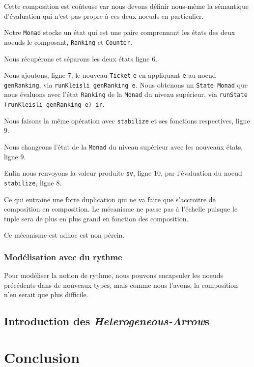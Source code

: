 \documentclass{llncs}
\newcommand{\SAs}{\emph{Heterogeneous-Arrow}s }
\begin{document}
Cette composition est coûteuse car nous devons définir nous-même la sémantique
d'évaluation qui n'est pas propre à ces deux noeuds en particulier.

Notre \lstinline{Monad} stocke un état qui est une paire comprennant les états
des deux noeuds le composant, \lstinline{Ranking} et \lstinline{Counter}.

Nous récupérons et séparons les deux états ligne 6.

Nous ajoutons, ligne 7, le nouveau \lstinline{Ticket} \lstinline{e} en appliquant \lstinline{e}
au noeud \lstinline{genRanking}, via \lstinline{runKleisli genRanking e}.
Nous obtenons un \lstinline{State Monad} que nous évaluons avec l'état \lstinline{Ranking}
de la \lstinline{Monad} du niveau supérieur, via \lstinline{runState (runKleisli genRanking e) ir}.

Nous faisons la même opération avec \lstinline{stabilize} et ses fonctions respectives,
ligne 9.

Nous changeons l'état de la \lstinline{Monad} du niveau supérieur avec les nouveaux
états, ligne 9.

Enfin nous renvoyons la valeur produite \lstinline{sv}, ligne 10, par l'évaluation
du noeud \lstinline{stabilize}, ligne 8.

Ce qui entraine une forte duplication qui ne va faire que s'accroitre de
composition en composition.
Le mécanisme ne passe pas à l'échelle puisque le tuple sera de plus en plus
grand en fonction des composition.

Ce mécanisme est adhoc est non pérein.

\subsubsection{Modélisation avec du rythme}
Pour modéliser la notion de rythme, nous pouvons encapsuler les noeuds
précédents dans de nouveaux types, mais comme nous l'avons, la composition
n'en serait que plus difficile.

\subsection{Introduction des \SAs}

\section{Conclusion}

% 
\end{document}
